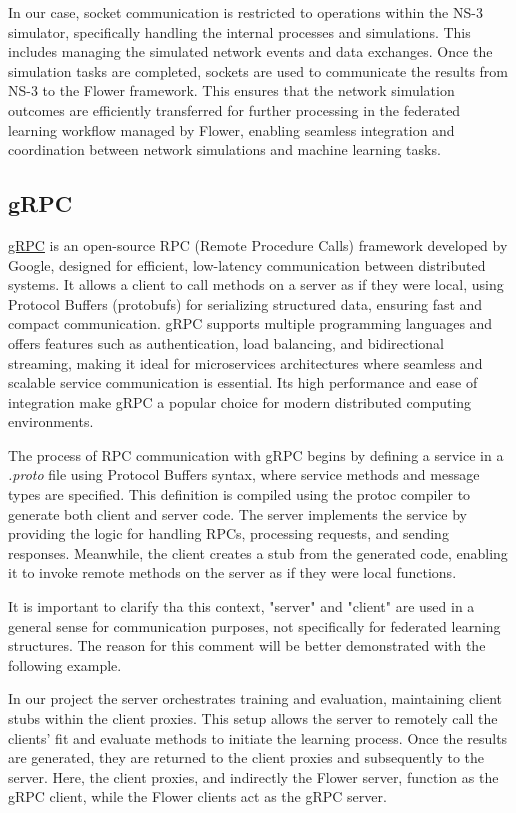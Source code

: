 In our case, socket communication is restricted to operations within the NS-3 simulator, specifically handling the internal processes and simulations. This includes managing
the simulated network events and data exchanges. Once the simulation tasks are completed, sockets are used to communicate the results from NS-3 to the Flower framework.
This ensures that the network simulation outcomes are efficiently transferred for further processing in the federated learning workflow managed by Flower, enabling seamless
integration and coordination between network simulations and machine learning tasks.

\subsection{gRPC}
\href{https://grpc.io/}{gRPC}
is an open-source RPC (Remote Procedure Calls) framework developed by Google, designed for efficient, low-latency communication between distributed systems.
It allows a client to call methods on a server as if they were local, using Protocol Buffers (protobufs) for serializing structured data, ensuring fast and compact
communication. gRPC supports multiple programming languages and offers features such as authentication, load balancing, and bidirectional streaming, making it
ideal for microservices architectures where seamless and scalable service communication is essential. Its high performance and ease of integration make gRPC a popular
choice for modern distributed computing environments.

The process of RPC communication with gRPC begins by defining a service in a \emph{.proto} file using Protocol Buffers syntax, where service methods and message types are
specified. This definition is compiled using the protoc compiler to generate both client and server code. The server implements the service by providing the logic
for handling RPCs, processing requests, and sending responses. Meanwhile, the client creates a stub from the generated code, enabling it to invoke remote methods
on the server as if they were local functions.

It is important to clarify tha this context, "server" and "client" are used in a general sense for communication purposes, not specifically for federated learning
structures. The reason for this comment will be better demonstrated with the following example.

In our project the server orchestrates training and evaluation, maintaining client stubs within the client proxies. This setup allows the server
to remotely call the clients' fit and evaluate methods to initiate the learning process. Once the results are generated, they are returned to the client proxies and
subsequently to the server. Here, the client proxies, and indirectly the Flower server, function as the gRPC client, while the Flower clients act as the gRPC server.



